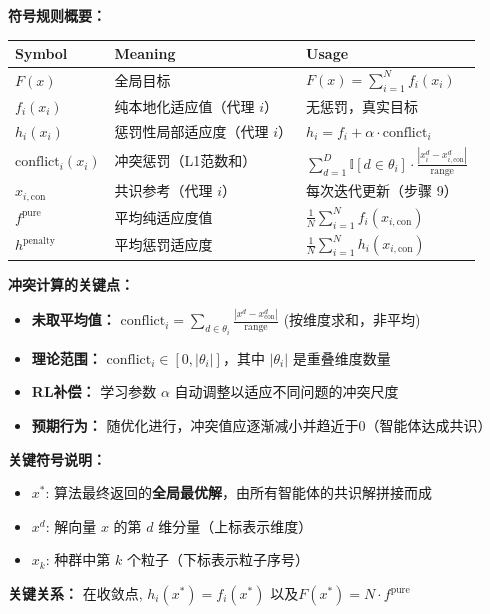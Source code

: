 \documentclass[11pt,a3paper]{ctexart}
\begin{document}
\textbf{符号规则概要：}
\begin{center}
\begin{tabular}{|l|l|l|}
\hline
\textbf{Symbol} & \textbf{Meaning} & \textbf{Usage} \\
\hline
$F(x)$ & 全局目标 & $F(x) = \sum_{i=1}^N f_i(x_i)$ \\
$f_i(x_i)$ & 纯本地化适应值（代理 $i$）& 无惩罚，真实目标 \\
$h_i(x_i)$ & 惩罚性局部适应度（代理 $i$）& $h_i = f_i + \alpha \cdot \text{conflict}_i$ \\
$\text{conflict}_i(x_i)$ & 冲突惩罚（L1范数和）& $\sum_{d=1}^D \mathbb{I}[d \in \theta_i] \cdot \frac{|x_i^d - x_{i,\text{con}}^d|}{\text{range}}$ \\
$x_{i,\text{con}}$ & 共识参考（代理 $i$）& 每次迭代更新（步骤 9） \\
$f^{\text{pure}}$ & 平均纯适应度值 & $\frac{1}{N}\sum_{i=1}^N f_i(x_{i,\text{con}})$ \\
$h^{\text{penalty}}$ & 平均惩罚适应度 & $\frac{1}{N}\sum_{i=1}^N h_i(x_{i,\text{con}})$ \\
\hline
\end{tabular}
\end{center}

\textbf{冲突计算的关键点：}
\begin{itemize}
    \item \textbf{未取平均值：} $\text{conflict}_i = \sum_{d \in \theta_i} \frac{|x^d - x_{\text{con}}^d|}{\text{range}}$ (按维度求和，非平均)
    \item \textbf{理论范围：} $\text{conflict}_i \in [0, |\theta_i|]$，其中 $|\theta_i|$ 是重叠维度数量
    \item \textbf{RL补偿：} 学习参数 $\alpha$ 自动调整以适应不同问题的冲突尺度
    \item \textbf{预期行为：} 随优化进行，冲突值应逐渐减小并趋近于0（智能体达成共识）
\end{itemize}

\textbf{关键符号说明：}
\begin{itemize}
    \item $x^*$: 算法最终返回的\textbf{全局最优解}，由所有智能体的共识解拼接而成
    \item $x^d$: 解向量 $x$ 的第 $d$ 维分量（上标表示维度）
    \item $x_k$: 种群中第 $k$ 个粒子（下标表示粒子序号）
\end{itemize}

\textbf{关键关系：} 在收敛点, $h_i(x^*) = f_i(x^*)$ 以及$F(x^*) = N \cdot f^{\text{pure}}$
\end{document}

